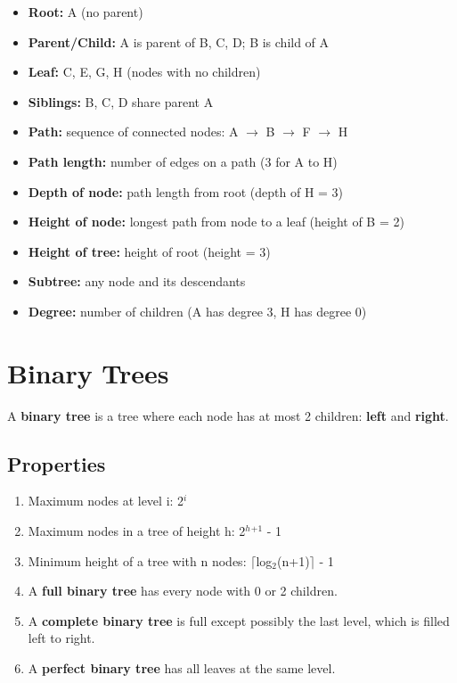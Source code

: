 \begin{itemize}
\item \textbf{Root:} A (no parent)
\item \textbf{Parent/Child:} A is parent of B, C, D; B is child of A
\item \textbf{Leaf:} C, E, G, H (nodes with no children)
\item \textbf{Siblings:} B, C, D share parent A
\item \textbf{Path:} sequence of connected nodes: A $\to $ B $\to $ F $\to $ H
\item \textbf{Path length:} number of edges on a path (3 for A to H)
\item \textbf{Depth of node:} path length from root (depth of H = 3)
\item \textbf{Height of node:} longest path from node to a leaf (height of B = 2)
\item \textbf{Height of tree:} height of root (height = 3)
\item \textbf{Subtree:} any node and its descendants
\item \textbf{Degree:} number of children (A has degree 3, H has degree 0)
\end{itemize}

\section{Binary Trees}

A \textbf{binary tree} is a tree where each node has at most 2 children: \textbf{left} and \textbf{right}.

\subsection{Properties}

\begin{enumerate}
\item Maximum nodes at level i: 2$^{i}$
\item Maximum nodes in a tree of height h: 2$^{h}$$^{+1}$ - 1
\item Minimum height of a tree with n nodes: $\lceil $log$_{2}$(n+1)$\rceil $ - 1
\item A \textbf{full binary tree} has every node with 0 or 2 children.
\item A \textbf{complete binary tree} is full except possibly the last level, which is filled left to right.
\item A \textbf{perfect binary tree} has all leaves at the same level.
\end{enumerate}


